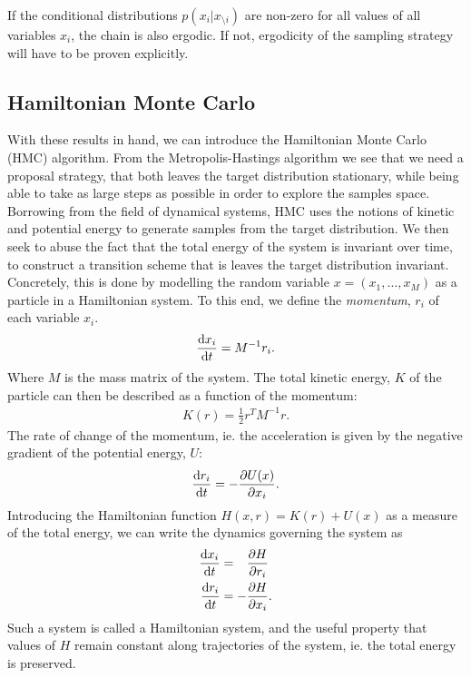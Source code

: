 If the conditional distributions $p(x_i|x_{\setminus i})$ are non-zero for all values of all variables $x_i$, the chain is also ergodic.
If not, ergodicity of the sampling strategy will have to be proven explicitly.

\subsection{Hamiltonian Monte Carlo}

With these results in hand, we can introduce the Hamiltonian Monte Carlo (HMC) algorithm.
From the Metropolis-Hastings algorithm we see that we need a proposal strategy, that both leaves the target distribution stationary, while being able to take as large steps as possible in order to explore the samples space.
Borrowing from the field of dynamical systems, HMC uses the notions of kinetic and potential energy to generate samples from the target distribution. 
We then seek to abuse the fact that the total energy of the system is invariant over time, to construct a transition scheme that is leaves the target distribution invariant.
Concretely, this is done by modelling the random variable $x=(x_1,\dots,x_M)$ as a particle in a Hamiltonian system.
To this end, we define the \emph{momentum}, $r_i$ of each variable $x_i$.
\begin{align}
    \dv{x_i}{t} = M^{-1} r_i.
\end{align}
Where $M$ is the mass matrix of the system.
The total kinetic energy, $K$ of the particle can then be described as a function of the momentum:
\begin{align}
    K(r) = \frac{1}{2}r^T M^{-1} r.
\end{align}
The rate of change of the momentum, ie. the acceleration is given by the negative gradient of the potential energy, $U$:
\begin{align}
    \dv{r_i}{t} = -\pdv{U(x)}{x_i}.
\end{align}
Introducing the Hamiltonian function $H(x, r) = K(r) + U(x)$ as a measure of the total energy, we can write the dynamics governing the system as
\begin{equation}\label{eq:hmc-dynamics}
    \begin{aligned}
        \dv{x_i}{t} &= \phantom{-}\pdv{H}{r_i}\\
        \dv{r_i}{t} &= -\pdv{H}{x_i}.
    \end{aligned}
\end{equation}
Such a system is called a Hamiltonian system, and the useful property that values of $H$ remain constant along trajectories of the system, ie. the total energy is preserved.
